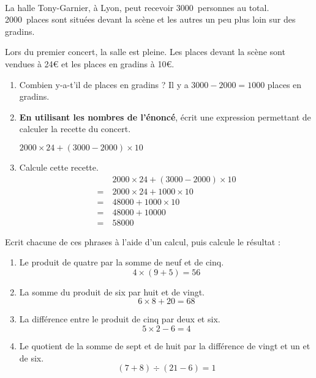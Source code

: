\documentclass[a4paper,11pt]{article}
\newcommand{\red}{\color{red}}
\begin{document}
\begin{question}[(4 points)]\

	La halle Tony-Garnier, à Lyon, peut recevoir 3000 personnes au total. 2000 places sont situées devant la scène et les autres un peu plus loin sur des gradins.

	Lors du premier concert, la salle est pleine. Les places devant la scène sont vendues à 24€ et les places en gradins à 10€.
	\begin{enumerate}
		\item Combien y-a-t'il de places en gradins ? {\red Il y a $3000 - 2000 = 1000$ places en gradins.}
		\item \textbf{En utilisant les nombres de l'énoncé}, écrit une expression permettant de calculer la recette du concert.

			      {\red $2000 × 24 + (3000 - 2000) × 10$}
		\item Calcule cette recette.
			      {\red \begin{align*}
					        & \ 2000 × 24 + (3000 - 2000) × 10 \\
					      = & \ 2000 × 24 + 1000 × 10          \\
					      = & \ 48 000 + 1000 × 10             \\
					      = & \ 48 000 + 10 000                \\
					      = & \ 58 000
				      \end{align*} }
	\end{enumerate}
\end{question}

\begin{question}[(2 points)]
	Ecrit chacune de ces phrases à l’aide d’un calcul, puis calcule le résultat :
	\begin{enumerate}
		\item Le produit de quatre par la somme de neuf et de cinq.
			      {\red $$ 4 × (9 + 5) = 56 $$}
		\item La somme du produit de six par huit et de vingt.
			      {\red $$ 6 × 8 + 20 = 68 $$}
		\item La différence entre le produit de cinq par deux et six.
			      {\red $$ 5 × 2 - 6 = 4 $$}
		\item Le quotient de la somme de sept et de huit par la différence de vingt et un et de six.
			      {\red $$ (7 + 8) ÷ (21 - 6) = 1 $$}
	\end{enumerate}
\end{question}
\end{document}
